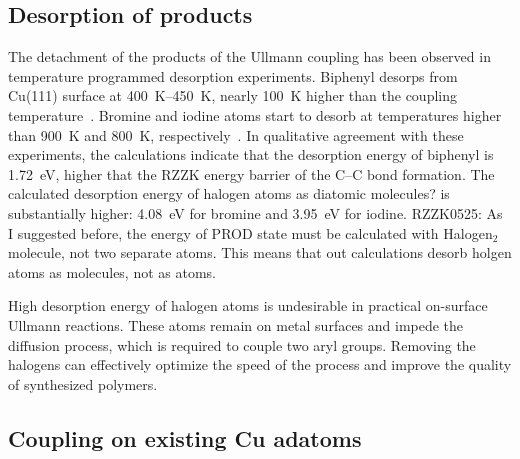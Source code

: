 \documentclass[aps,prb,amsmath,amssymb,11pt]{revtex4-1}
\newcommand{\lock}{\color{red}}
\newcommand{\lock}{\color{black}}
\newcommand{\comm}{\color{purple}} %
\begin{document}
\ifdefined\INTERNAL
\subsection{Desorption of products}

{\lock

The detachment of the products of the Ullmann coupling has been observed in temperature programmed desorption experiments. Biphenyl desorps from Cu(111) surface at \SIrange{400}{450}{\kelvin}, nearly \SI{100}{\kelvin} higher than the coupling temperature~\cite{ullmann_104}. Bromine and iodine atoms start to desorb at temperatures higher than \SI{900}{\kelvin} and \SI{800}{\kelvin}, respectively~\cite{jacs2013, ullmann_104}. 
In qualitative agreement with these experiments, the calculations indicate that the desorption energy of biphenyl is \SI{+1.72}{\electronvolt}, higher that the RZZK energy barrier of the C--C bond formation. The calculated desorption energy of halogen atoms {\comm as diatomic molecules?} is substantially higher: \SI{+4.08}{\electronvolt} for bromine and \SI{+3.95}{\electronvolt} for iodine. 
{\comm RZZK0525: As I suggested before, the energy of PROD state must be calculated with Halogen$_2$ molecule, not two separate atoms. This means that out calculations desorb holgen atoms as molecules, not as atoms.}

High desorption energy of halogen atoms is undesirable in practical on-surface Ullmann reactions. These atoms remain on metal surfaces and impede the diffusion process, which is required to couple two aryl groups. Removing the halogens can effectively optimize the speed of the process and improve the quality of synthesized polymers.

}
\fi

\ifdefined\INTERNAL
\subsection{Coupling on existing Cu adatoms}
\fi
\end{document}
